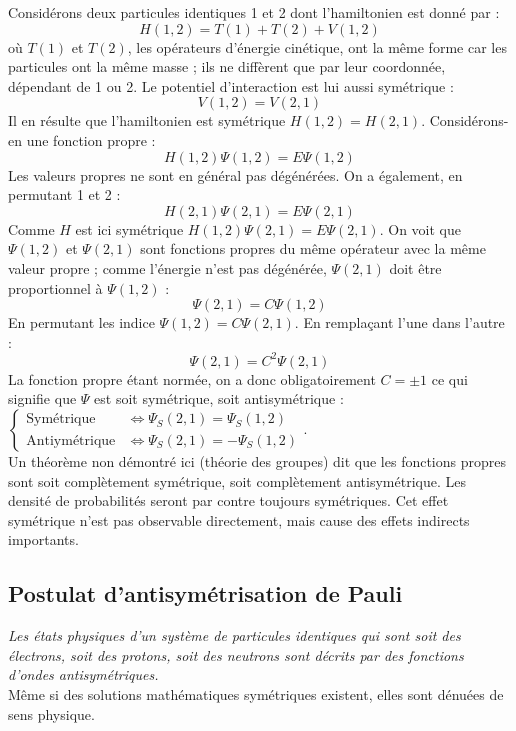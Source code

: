 \documentclass[british,french,11pt, a4paper, openany]{book}
\begin{document}
Considérons deux particules identiques 1 et 2 dont l'hamiltonien est donné par :
\begin{equation}
	H(1,2) = T(1)+T(2) + V(1,2)
\end{equation}
où $T(1)$ et $T(2)$, les opérateurs d'énergie cinétique, ont la même forme car les particules ont la même masse ; ils ne diffèrent que par leur coordonnée, dépendant de 1 ou 2. Le potentiel d'interaction est lui aussi symétrique :
\begin{equation}
	V(1,2) = V(2,1)
\end{equation}
Il en résulte que l'hamiltonien est symétrique $H(1,2) = H(2,1)$. Considérons-en une fonction propre :
\begin{equation}
	H(1,2)\Psi(1,2) = E\Psi(1,2)
\end{equation}
Les valeurs propres ne sont en général pas dégénérées. On a également, en permutant 1 et 2 :
\begin{equation}
	H(2,1)\Psi(2,1) = E\Psi(2,1)
\end{equation}
Comme $H$ est ici symétrique $H(1,2)\Psi(2,1) = E\Psi(2,1)$. On voit que $\Psi(1,2)$ et $\Psi(2,1)$ sont fonctions propres du même opérateur avec la même valeur propre ; comme l'énergie n'est pas dégénérée, $\Psi(2,1)$ doit être proportionnel à $\Psi(1,2)$ :
\begin{equation}
	\Psi(2,1) = C\Psi(1,2)
\end{equation}
En permutant les indice $\Psi(1,2) = C\Psi(2,1)$. En remplaçant l'une dans l'autre :
\begin{equation}
	\Psi(2,1) = C^2\Psi(2,1)
\end{equation}
La fonction propre étant normée, on a donc obligatoirement $C = \pm 1$ ce qui signifie que $\Psi$ est soit symétrique, soit antisymétrique :
$\left\{\begin{array}{ll}
\text{Symétrique} &\Leftrightarrow \Psi_S(2,1) = \Psi_S(1,2)\\
\text{Antiymétrique} &\Leftrightarrow \Psi_S(2,1) = -\Psi_S(1,2)
\end{array}\right.$.\\
Un théorème non démontré ici (théorie des groupes) dit que les fonctions propres sont soit complètement symétrique, soit complètement antisymétrique. Les densité de probabilités seront par contre toujours symétriques. Cet effet symétrique n'est pas observable directement, mais cause des effets indirects importants.

\subsection{Postulat d'antisymétrisation de Pauli}
\textit{Les états physiques d'un système de particules identiques qui sont soit des électrons, soit des protons, soit des neutrons sont décrits par des fonctions d'ondes antisymétriques.}\\
Même si des solutions mathématiques symétriques existent, elles sont dénuées de sens physique.\\
\end{document}
